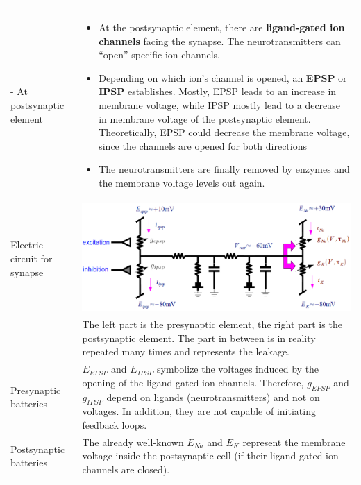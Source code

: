 \begin{longtable}{p{4cm}p{15cm}}
\begin{itemize}
                        	  \end{itemize}\\
- At postsynaptic element	& \begin{itemize}
                         	  	\item At the postsynaptic element, there are \textbf{ligand-gated ion channels} facing the synapse. The neurotransmitters can ``open'' specific ion channels.
					\item Depending on which ion's channel is opened, an \textbf{EPSP} or \textbf{IPSP} establishes. Mostly, EPSP leads to an increase in membrane voltage, while IPSP mostly lead to a decrease in membrane voltage of the postsynaptic element. Theoretically, EPSP could decrease the membrane voltage, since the channels are opened for both directions
					\item The neurotransmitters are finally removed by enzymes and the membrane voltage levels out again.
                         	  \end{itemize}\\
Electric circuit for synapse	& \includegraphics[width = 15cm]{neuroinf_synapse.png}\\
		& The left part is the presynaptic element, the right part is the postsynaptic element. The part in between is in reality repeated many times and represents the leakage.\\
Presynaptic batteries	& $E_{EPSP}$ and $E_{IPSP}$ symbolize the voltages induced by the opening of the ligand-gated ion channels. Therefore, $g_{EPSP}$ and $g_{IPSP}$ depend on ligands (neurotransmitters) and not on voltages. In addition, they are not capable of initiating feedback loops.\\
Postsynaptic batteries	& The already well-known $E_{Na}$ and $E_K$ represent the membrane voltage inside the postsynaptic cell (if their ligand-gated ion channels are closed).\\


\end{longtable}
